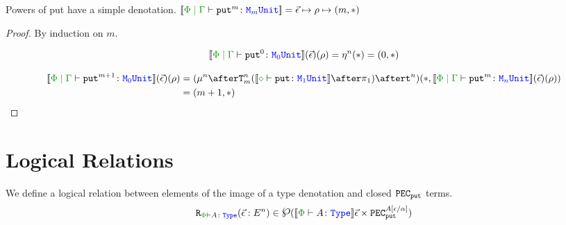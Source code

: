 \documentclass{Report}
\newcommand{\powerset}{\raisebox{.15\baselineskip}{\Large\ensuremath{\wp}}}
\newcommand\erelates[2]{\texttt{R}_{\wellformedt{#1}{#2}}}
\newcommand\powset[1]{\powerset(#1)}
\newcommand\fundRho[0]{(\ev)(\rho)}
\begin{document}
\begin{lemma}
    Powers of put have a simple denotation.
$\deno{\gpetyperelation{\put^m}{\M{m}{\U}}} = \ev\mapsto\rho\mapsto(m, \singleton)$    
\end{lemma}

\begin{proof}
    By induction on $m$.

    
    \begin{equation}
        \deno{\gpetyperelation{\put^0}{\M{0}{\U}}}\fundRho = \pointn{}(\singleton) = (0, \singleton)
    \end{equation}
    
    \begin{align*}
        \deno{\gpetyperelation{\put^{m+1}}{\M{0}{\U}}}\fundRho & = (\bindmu^n\after\Tn{m}{(\deno{\typerelation{\nil}{\put}{\M{1}{\U}}}\after\p)}\after \strengtht^n)(\singleton, \deno{\gpetyperelation{\put^m}{\M{n}{\U}}}\fundRho)\\
        & = (m+1, \singleton)
    \end{align*}
\end{proof}

\section{Logical Relations}

We define a logical relation between elements of the image of a type denotation and closed $\texttt{PEC}_{\texttt{put}}$ terms.
\begin{equation}
    \label{LogicalRelationType}
    \erelates{\P}{A}(\ev: E^n) \in \powset{\deno{\wellformedt{\P}{A}}\ev\times \pecput^{A\ssub{\a}{\e}}}
\end{equation}
\end{document}
